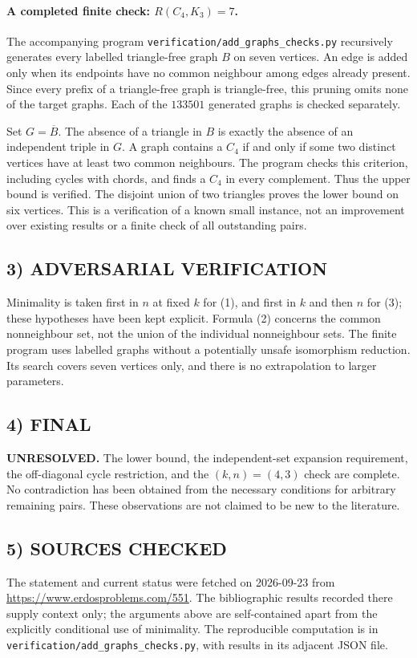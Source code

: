 \paragraph{A completed finite check: $R(C_4,K_3)=7$.}
The accompanying program \texttt{verification/add\_graphs\_checks.py} recursively generates every labelled triangle-free graph $B$ on seven vertices. An edge is added only when its endpoints have no common neighbour among edges already present. Since every prefix of a triangle-free graph is triangle-free, this pruning omits none of the target graphs. Each of the $133501$ generated graphs is checked separately.

Set $G=\overline B$. The absence of a triangle in $B$ is exactly the absence of an independent triple in $G$. A graph contains a $C_4$ if and only if some two distinct vertices have at least two common neighbours. The program checks this criterion, including cycles with chords, and finds a $C_4$ in every complement. Thus the upper bound is verified. The disjoint union of two triangles proves the lower bound on six vertices. This is a verification of a known small instance, not an improvement over existing results or a finite check of all outstanding pairs.

\subsection{3) ADVERSARIAL VERIFICATION}
Minimality is taken first in $n$ at fixed $k$ for (1), and first in $k$ and then $n$ for (3); these hypotheses have been kept explicit. Formula (2) concerns the common nonneighbour set, not the union of the individual nonneighbour sets. The finite program uses labelled graphs without a potentially unsafe isomorphism reduction. Its search covers seven vertices only, and there is no extrapolation to larger parameters.

\subsection{4) FINAL}
\textbf{UNRESOLVED.} The lower bound, the independent-set expansion requirement, the off-diagonal cycle restriction, and the $(k,n)=(4,3)$ check are complete. No contradiction has been obtained from the necessary conditions for arbitrary remaining pairs. These observations are not claimed to be new to the literature.

\subsection{5) SOURCES CHECKED}
The statement and current status were fetched on 2026-09-23 from \url{https://www.erdosproblems.com/551}. The bibliographic results recorded there supply context only; the arguments above are self-contained apart from the explicitly conditional use of minimality. The reproducible computation is in \texttt{verification/add\_graphs\_checks.py}, with results in its adjacent JSON file.

